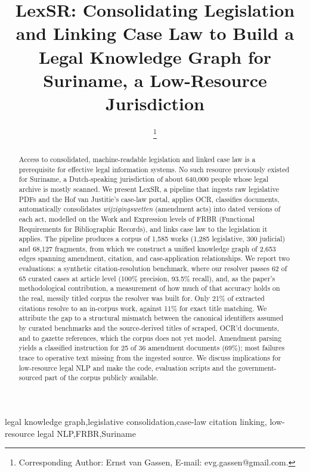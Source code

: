 \documentclass{IOS-Book-Article}
\def\hb{\hbox to 11.5 cm{}}
\begin{document}
\def\thepage{}
\begin{frontmatter}

\title{LexSR: Consolidating Legislation and Linking Case Law to Build a Legal Knowledge Graph for Suriname, a Low-Resource Jurisdiction}


\author[A]{ %
\thanks{Corresponding Author: Ernst van Gassen, E-mail: evg.gassen@gmail.com.}}

\address[A]{Independent researcher at Arktos AI Lab}

\begin{abstract}
Access to consolidated, machine-readable legislation and linked case law is a prerequisite
for effective legal information systems. No such resource previously existed for Suriname, a
Dutch-speaking jurisdiction of about 640,000 people whose legal archive is mostly scanned.
We present LexSR, a pipeline that ingests raw legislative PDFs and
the Hof van Justitie's case-law portal, applies OCR, classifies documents, automatically
consolidates \emph{wijzigingswetten} (amendment acts) into dated versions of each act,
modelled on the Work and Expression levels of FRBR (Functional Requirements for
Bibliographic Records), and links case law to the legislation it applies. The pipeline produces a
corpus of 1,585 works (1,285 legislative, 300 judicial) and 68,127 fragments, from
which we construct a unified knowledge graph of 2,653 edges spanning amendment,
citation, and case-application relationships. We report two evaluations: a synthetic
citation-resolution benchmark, where our resolver passes 62 of 65 curated cases at article
level (100\% precision, 93.5\% recall), and, as the paper's methodological contribution, a measurement of
how much of that accuracy holds on the real, messily titled corpus the resolver was built
for. Only 21\% of extracted citations resolve to an
in-corpus work, against 11\% for exact title matching. We attribute the gap to a structural
mismatch between the canonical identifiers assumed by curated benchmarks and the
source-derived titles of scraped, OCR'd documents, and to gazette references, which the
corpus does not yet model. Amendment parsing yields a classified instruction for 25 of 36
amendment documents (69\%); most failures trace to operative text missing from the
ingested source. We discuss
implications for low-resource legal NLP and make the code, evaluation scripts and the
government-sourced part of the corpus publicly available.
\end{abstract}

\begin{keyword}
legal knowledge graph\sep legislative consolidation\sep case-law citation linking\sep
low-resource legal NLP\sep FRBR\sep Suriname
\end{keyword}
\end{frontmatter}
\pagestyle{empty}
\thispagestyle{empty}
\end{document}
